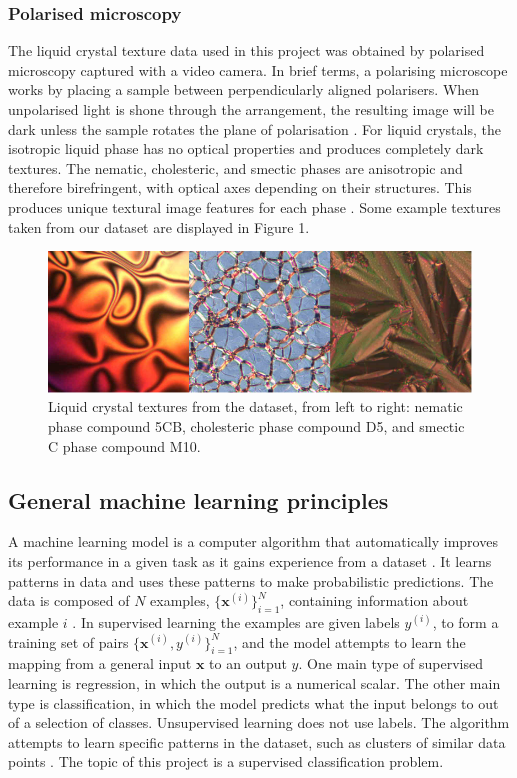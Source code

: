 \documentclass[12pt]{article}
\begin{document}
\subsubsection{Polarised microscopy}
The liquid crystal texture data used in this project was obtained by polarised microscopy captured with a video camera. In brief terms, a polarising microscope works by placing a sample between perpendicularly aligned polarisers. When unpolarised light is shone through the arrangement, the resulting image will be dark unless the sample rotates the plane of polarisation \cite{Dierking03}. For liquid crystals, the isotropic liquid phase has no optical properties and produces completely dark textures. The nematic, cholesteric, and smectic phases are anisotropic and therefore birefringent, with optical axes depending on their structures. This produces unique textural image features for each phase \cite{Dierking03}. Some example textures taken from our dataset are displayed in Figure 1.

\begin{figure}[!htb]
\centering
\includegraphics[width=6in]{images/texture_samples.png}
\caption{Liquid crystal textures from the dataset, from left to right: nematic phase compound 5CB, cholesteric phase compound D5, and smectic C phase compound M10.}
\end{figure}
\subsection{General machine learning principles}
A machine learning model is a computer algorithm that automatically improves its performance in a given task as it gains experience from a dataset \cite{Goodfellow16}. It learns patterns in data and uses these patterns to make probabilistic predictions. The data is composed of $N$ examples, $\{\bm{x}^{(i)}\}_{i=1}^N$, containing information about example $i$ \cite{Murphy12}. In supervised learning the examples are given labels $y^{(i)}$, to form a training set of pairs $\{\bm{x}^{(i)}, y^{(i)}\}_{i=1}^N$, and the model attempts to learn the mapping from a general input $\bm{x}$ to an output $\hat{y}$. One main type of supervised learning is regression, in which the output is a numerical scalar. The other main type is classification, in which the model predicts what the input belongs to out of a selection of classes. Unsupervised learning does not use labels. The algorithm attempts to learn specific patterns in the dataset, such as clusters of similar data points \cite{Murphy12}. The topic of this project is a supervised classification problem.
\end{document}
